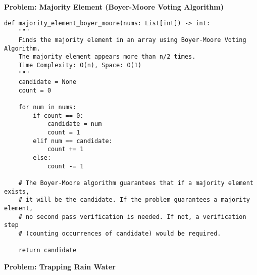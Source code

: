 \noindent\textbf{Problem: Majority Element (Boyer-Moore Voting Algorithm)}
\begin{verbatim}
def majority_element_boyer_moore(nums: List[int]) -> int:
    """
    Finds the majority element in an array using Boyer-Moore Voting Algorithm. 
    The majority element appears more than n/2 times.
    Time Complexity: O(n), Space: O(1)
    """
    candidate = None
    count = 0

    for num in nums:
        if count == 0:
            candidate = num
            count = 1
        elif num == candidate:
            count += 1
        else:
            count -= 1
            
    # The Boyer-Moore algorithm guarantees that if a majority element exists,
    # it will be the candidate. If the problem guarantees a majority element,
    # no second pass verification is needed. If not, a verification step
    # (counting occurrences of candidate) would be required.
    
    return candidate
\end{verbatim}

\noindent\textbf{Problem: Trapping Rain Water}

